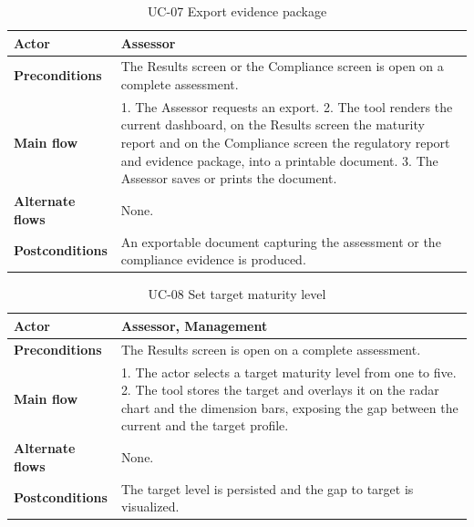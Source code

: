 \begin{table}[H]
\centering
\caption{UC-07 Export evidence package}
\label{tab:uc07}
\begin{tabular}{|p{3cm}|p{12cm}|}
\hline
\textbf{Actor} & Assessor \\
\hline
\textbf{Preconditions} & The Results screen or the Compliance screen is open on a complete assessment. \\
\hline
\textbf{Main flow} & 1. The Assessor requests an export. 2. The tool renders the current dashboard, on the Results screen the maturity report and on the Compliance screen the regulatory report and evidence package, into a printable document. 3. The Assessor saves or prints the document. \\
\hline
\textbf{Alternate flows} & None. \\
\hline
\textbf{Postconditions} & An exportable document capturing the assessment or the compliance evidence is produced. \\
\hline
\end{tabular}
\end{table}

\begin{table}[H]
\centering
\caption{UC-08 Set target maturity level}
\label{tab:uc08}
\begin{tabular}{|p{3cm}|p{12cm}|}
\hline
\textbf{Actor} & Assessor, Management \\
\hline
\textbf{Preconditions} & The Results screen is open on a complete assessment. \\
\hline
\textbf{Main flow} & 1. The actor selects a target maturity level from one to five. 2. The tool stores the target and overlays it on the radar chart and the dimension bars, exposing the gap between the current and the target profile. \\
\hline
\textbf{Alternate flows} & None. \\
\hline
\textbf{Postconditions} & The target level is persisted and the gap to target is visualized. \\
\hline
\end{tabular}
\end{table}

